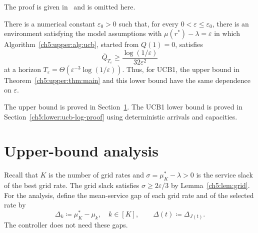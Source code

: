 The proof is given in~\cite[Appendix~J, p.~41 of the PDF]{wijewardena2026banditbased}
and is omitted here.

\begin{Thm:Theorem}
\label{ch5:upper:thm:ucb-log-lower}
There is a numerical constant $\varepsilon_0>0$ such that, for every
$0<\varepsilon\le\varepsilon_0$, there is an environment satisfying the
model assumptions with $\mu(r^*)-\lambda=\varepsilon$ in which
Algorithm~\ref{ch5:upper:alg:ucb}, started from $Q(1)=0$, satisfies
\begin{equation}
 \overline Q_{T_\varepsilon}
 \ge\frac{\log(1/\varepsilon)}{32\varepsilon^2}
 \label{ch5:upper:eq:ucb-log-lower}
\end{equation}
at a horizon $T_\varepsilon=\Theta(\varepsilon^{-3}\log(1/\varepsilon))$.
Thus, for UCB1, the upper bound in Theorem~\ref{ch5:upper:thm:main} and this lower bound have the same dependence on $\varepsilon$.
\end{Thm:Theorem}

The upper bound is proved in Section~\ref{ch5:upper:sec:bound}.
The UCB1 lower bound is proved in Section~\ref{ch5:lower:ucb-log-proof}
using deterministic arrivals and capacities.

\section{Upper-bound analysis}
\label{ch5:upper:sec:bound}

Recall that $K$ is the number of grid rates and
$\sigma=\mu_K^*-\lambda>0$ is the service slack of the best grid rate.
The grid slack satisfies
$\sigma\ge2\varepsilon/3$ by Lemma~\ref{ch5:lem:grid}.
For the analysis, define the mean-service gap of each grid rate and of the
selected rate by
\begin{equation}
 \Delta_k\coloneqq\mu_K^*-\mu_k,\quad k\in[K],
 \qquad \Delta(t)\coloneqq\Delta_{J(t)}.
 \label{ch5:upper:eq:slack-gaps}
\end{equation}
The controller does not need these gaps.

